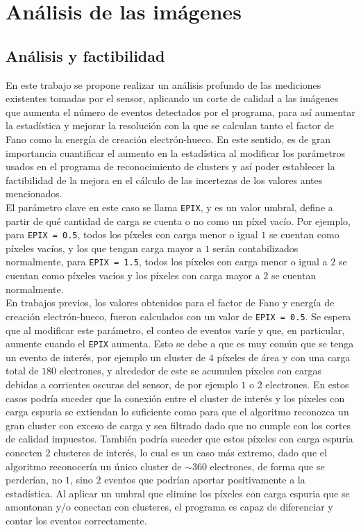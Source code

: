 \chapter{Análisis de las imágenes}
\section{Análisis y factibilidad}
\noindent En este trabajo se propone realizar un análisis profundo de las mediciones existentes tomadas por el sensor, aplicando un corte de calidad a las imágenes que aumenta el número de eventos detectados por el programa, para así aumentar la estadística y mejorar la resolución con la que se calculan tanto el factor de Fano como la energía de creación electrón-hueco. %
En este sentido, es de gran importancia cuantificar el aumento en la estadística al modificar los parámetros usados en el programa de reconocimiento de clusters y así poder establecer la factibilidad de la mejora en el cálculo de las incertezas de los valores antes mencionados.\\
\indent El parámetro clave en este caso se llama \verb|EPIX|, y es un valor umbral, define a partir de qué cantidad de carga se cuenta o no como un píxel vacío. Por ejemplo, para \verb|EPIX = 0.5|, todos los píxeles con carga menor o igual $1$ se cuentan como píxeles vacíos, y los que tengan carga mayor a $1$ serán contabilizados normalmente, para \verb|EPIX = 1.5|, todos los píxeles con carga menor o igual a $2$ se cuentan como píxeles vacíos y los píxeles con carga mayor a $2$ se cuentan normalmente.\\
\indent En trabajos previos\cite{TesisKevin}, los valores obtenidos para el factor de Fano y energía de creación electrón-hueco, fueron calculados con un valor de \verb|EPIX = 0.5|. Se espera que al modificar este parámetro, el conteo de eventos varíe y que, en particular, aumente cuando el \verb|EPIX| aumenta. Esto se debe a que es muy común que se tenga un evento de interés, por ejemplo un cluster de $4$ píxeles de área y con una carga total de $180$ electrones, y alrededor de este se acumulen píxeles con cargas debidas a corrientes oscuras del sensor, de por ejemplo $1$ o $2$ electrones. En estos casos podría suceder que la conexión entre el cluster de interés y los píxeles con carga espuria se extiendan lo suficiente como para que el algoritmo reconozca un gran cluster con exceso de carga y sea filtrado dado que no cumple con los cortes de calidad impuestos. También podría suceder que estos píxeles con carga espuria conecten $2$ clusteres de interés, lo cual es un caso más extremo, dado que el algoritmo reconocería un único cluster de $\sim 360$ electrones, de forma que se perderían, no $1$, sino $2$ eventos que podrían aportar positivamente a la estadística. Al aplicar un umbral que elimine los píxeles con carga espuria que se amontonan y/o conectan con clusteres, el programa es capaz de diferenciar y contar los eventos correctamente.\\
